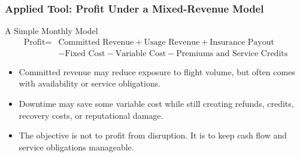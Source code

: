 \documentclass{beamer}
\begin{document}
\begin{frame}[t]
  \frametitle{Applied Tool: Profit Under a Mixed-Revenue Model}
  \begin{block}{A Simple Monthly Model}
  \[
  \begin{split}
    \text{Profit}={}&\text{Committed Revenue}+\text{Usage Revenue}+\text{Insurance Payout}\\
    &-\text{Fixed Cost}-\text{Variable Cost}-\text{Premiums and Service Credits}
  \end{split}
  \]
  \end{block}
  \begin{itemize}
    \item Committed revenue may reduce exposure to flight volume, but often comes with availability or service obligations.
    \item Downtime may save some variable cost while still creating refunds, credits, recovery costs, or reputational damage.
    \item The objective is not to profit from disruption. It is to keep cash flow and service obligations manageable.
  \end{itemize}
\end{frame}
\end{document}
